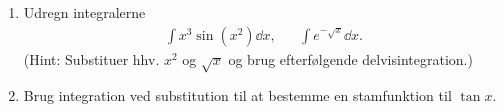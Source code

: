 \begin{enumerate}
	\item Udregn integralerne
	\begin{align*}
	\int x^3\sin(x^2) \dd x,&& \int e^{-\sqrt{x}} \dd x.
	\end{align*}
	(Hint: Substituer hhv. $x^2$ og $\sqrt{x}$ og brug efterfølgende delvisintegration.)
	
	\item Brug integration ved substitution til at bestemme en stamfunktion til $\tan x$.
\end{enumerate}